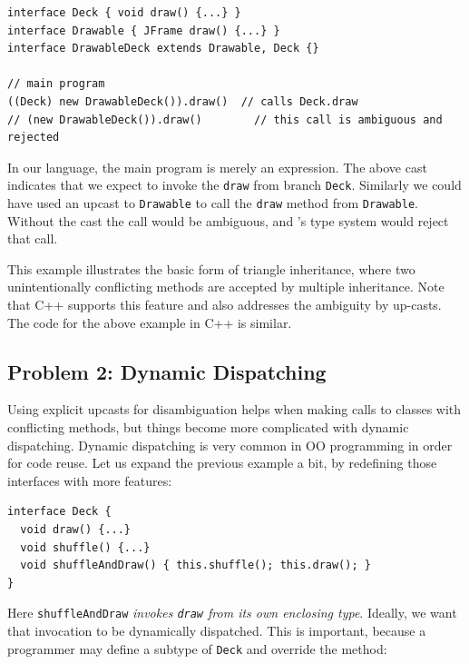 \vspace{3pt}\begin{lstlisting}
interface Deck { void draw() {...} }
interface Drawable { JFrame draw() {...} }
interface DrawableDeck extends Drawable, Deck {}

// main program
((Deck) new DrawableDeck()).draw()  // calls Deck.draw
// (new DrawableDeck()).draw()        // this call is ambiguous and rejected
\end{lstlisting}\vspace{3pt}
In our language, the main program is merely an expression. The above cast indicates
that we expect to invoke the \lstinline|draw| from branch
\lstinline|Deck|. Similarly we could have used an upcast to \lstinline|Drawable|
to call the \lstinline|draw| method from \lstinline|Drawable|.
Without the cast the call would be ambiguous, and
\MIM{}'s type system would reject that call. 

This example illustrates the basic form of triangle inheritance, where two unintentionally conflicting methods
are accepted by multiple inheritance. Note that C++ supports this feature and also addresses the
ambiguity by up-casts. The code for the above example in C++ is similar. 


\subsection{Problem 2: Dynamic Dispatching}\label{subsec:problem2}
Using explicit upcasts for disambiguation helps when making calls to
classes with conflicting methods, but things
become more complicated with dynamic dispatching. Dynamic
dispatching is very common in OO programming in order for code reuse. Let us expand the previous
example a bit, by redefining those interfaces with more features:

\vspace{3pt}\begin{lstlisting}
interface Deck {
  void draw() {...}
  void shuffle() {...}
  void shuffleAndDraw() { this.shuffle(); this.draw(); }
}
\end{lstlisting}\vspace{3pt}
Here \lstinline|shuffleAndDraw| \emph{invokes \lstinline|draw| from its own enclosing type}. Ideally,
we want that invocation to be dynamically dispatched. This is important, because a programmer may define a subtype
of \lstinline|Deck| and override the method:

